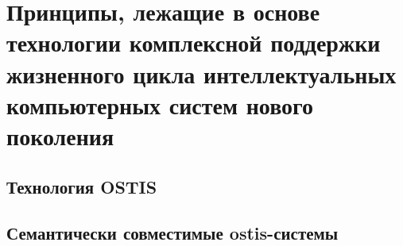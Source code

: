 \chapter{Принципы, лежащие в основе технологии комплексной поддержки жизненного цикла интеллектуальных компьютерных систем нового поколения}
\label{chapter_ostis_tech} 


\section{Технология OSTIS}
\section{Семантически совместимые ostis-системы}

%